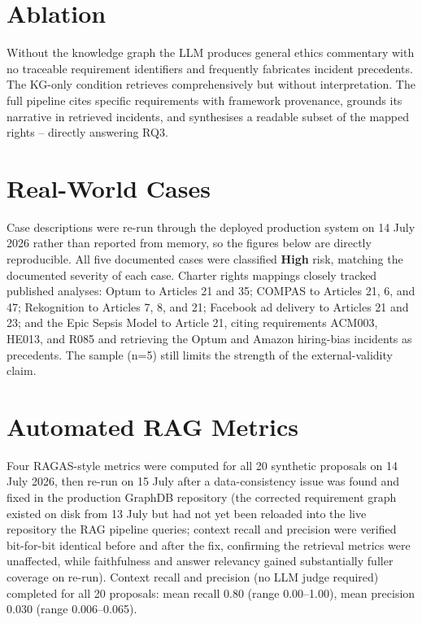 \documentclass[a4paper,oneside,12pt]{book}
\numberwithin{equation}{chapter}
\begin{document}
\section{Ablation}

Without the knowledge graph the LLM produces general ethics commentary with no traceable requirement identifiers and frequently fabricates incident precedents. The KG-only condition retrieves comprehensively but without interpretation. The full pipeline cites specific requirements with framework provenance, grounds its narrative in retrieved incidents, and synthesises a readable subset of the mapped rights -- directly answering RQ3.

\section{Real-World Cases}

Case descriptions were re-run through the deployed production system on 14 July 2026 rather than reported from memory, so the figures below are directly reproducible. All five documented cases were classified \textbf{High} risk, matching the documented severity of each case. Charter rights mappings closely tracked published analyses: Optum to Articles 21 and 35; COMPAS to Articles 21, 6, and 47; Rekognition to Articles 7, 8, and 21; Facebook ad delivery to Articles 21 and 23; and the Epic Sepsis Model to Article 21, citing requirements ACM003, HE013, and R085 and retrieving the Optum and Amazon hiring-bias incidents as precedents. The sample (n=5) still limits the strength of the external-validity claim.

\section{Automated RAG Metrics}

Four RAGAS-style metrics \cite{gao2023rag} were computed for all 20 synthetic proposals on 14 July 2026, then re-run on 15 July after a data-consistency issue was found and fixed in the production GraphDB repository (the corrected requirement graph existed on disk from 13 July but had not yet been reloaded into the live repository the RAG pipeline queries; context recall and precision were verified bit-for-bit identical before and after the fix, confirming the retrieval metrics were unaffected, while faithfulness and answer relevancy gained substantially fuller coverage on re-run). Context recall and precision (no LLM judge required) completed for all 20 proposals: mean recall 0.80 (range 0.00--1.00), mean precision 0.030 (range 0.006--0.065).
\end{document}
